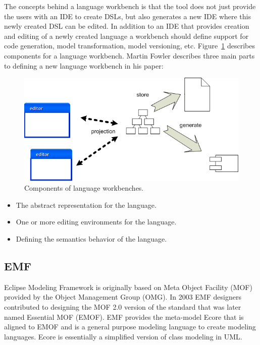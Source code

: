 The concepts behind a language workbench is that the tool does not just provide
the users with an IDE to create DSLs, but also generates a new IDE where this
newly created DSL can be edited. In addition to an IDE that provides creation
and editing of a newly created language a workbench should define support for
code generation, model transformation, model versioning, etc\cite{Lamo2013}.
Figure~\ref{fig:workbench} describes components for a language workbench. Martin
Fowler describes three main parts to defining a new language workbench in his
paper\cite{fowler2005language}:

\begin{figure}[H]
	\centering
	\includegraphics[scale=0.6]{./Figures/workbench.png}
	\caption[Components of language workbenches]
	{Components of language workbenches.}
	\label{fig:workbench}
\end{figure}

\begin{itemize}
  \item The abstract representation for the language.
  \item One or more editing environments for the language.
  \item Defining the semantics behavior of the language. 
\end{itemize}

\subsection{EMF}

Eclipse Modeling Framework is originally based on Meta Object Facility (MOF)
provided by the Object Management Group (OMG). In 2003 EMF designers contributed
to designing the MOF 2.0 version of the standard that was later named Essential
MOF (EMOF). EMF provides the meta-model Ecore that is aligned to EMOF and is a
general purpose modeling language to create modeling languages. Ecore is
essentially a simplified version of class modeling in UML.

